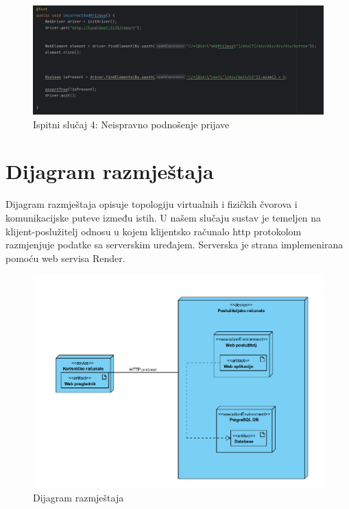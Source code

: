 			
			\begin{figure}[H]
			\includegraphics[scale=0.5]{slike/neispravnaPrijava.PNG} %
			\centering
			\caption{Ispitni slučaj 4: Neispravno podnošenje prijave}
			\label{fig:implementacija}
		\end{figure}
			
			\eject 
		
		
		\section{Dijagram razmještaja}
			
			 Dijagram razmještaja opisuje topologiju virtualnih i fizičkih čvorova i komunikacijske puteve između istih. U našem slučaju sustav je temeljen na klijent-poslužitelj odnosu u kojem klijentsko računalo http protokolom razmjenjuje podatke sa serverskim uređajem. Serverska je strana implemenirana pomoću web servisa Render.
			 
			 \begin{figure}[H]
			\includegraphics[scale=0.5]{slike/deploymentDiagram.PNG} %
			\centering
			\caption{Dijagram razmještaja}
			\label{fig:implementacija}
		\end{figure}
			
